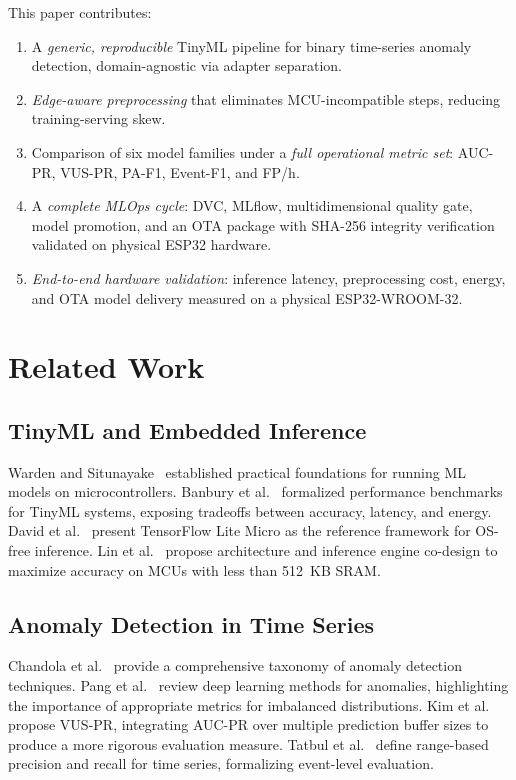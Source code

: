 \documentclass[conference]{IEEEtran}
\begin{document}
This paper contributes:
\begin{enumerate}
  \item A \emph{generic, reproducible} TinyML pipeline for binary time-series
        anomaly detection, domain-agnostic via adapter separation.
  \item \emph{Edge-aware preprocessing} that eliminates MCU-incompatible
        steps, reducing training-serving skew.
  \item Comparison of six model families under a \emph{full operational
        metric set}: AUC-PR, VUS-PR, PA-F1, Event-F1, and FP/h.
  \item A \emph{complete MLOps cycle}: DVC, MLflow, multidimensional quality
        gate, model promotion, and an OTA package with SHA-256 integrity
        verification validated on physical ESP32 hardware.
  \item \emph{End-to-end hardware validation}: inference latency, preprocessing
        cost, energy, and OTA model delivery measured on a physical ESP32-WROOM-32.
\end{enumerate}

\section{Related Work}
\label{sec:related}

\subsection{TinyML and Embedded Inference}

Warden and Situnayake~\cite{warden2019tinyml} established practical foundations
for running ML models on microcontrollers.
Banbury et al.~\cite{banbury2021mlperf} formalized performance benchmarks for
TinyML systems, exposing tradeoffs between accuracy, latency, and energy.
David et al.~\cite{david2021tensorflow} present TensorFlow Lite Micro as
the reference framework for OS-free inference.
Lin et al.~\cite{lin2020mcunet} propose architecture and inference engine
co-design to maximize accuracy on MCUs with less than 512~KB SRAM.

\subsection{Anomaly Detection in Time Series}

Chandola et al.~\cite{chandola2009anomaly} provide a comprehensive taxonomy
of anomaly detection techniques.
Pang et al.~\cite{pang2021deep} review deep learning methods for anomalies,
highlighting the importance of appropriate metrics for imbalanced distributions.
Kim et al.~\cite{kim2022towards} propose VUS-PR, integrating AUC-PR over
multiple prediction buffer sizes to produce a more rigorous evaluation measure.
Tatbul et al.~\cite{tatbul2018precision} define range-based precision and
recall for time series, formalizing event-level evaluation.
\end{document}
